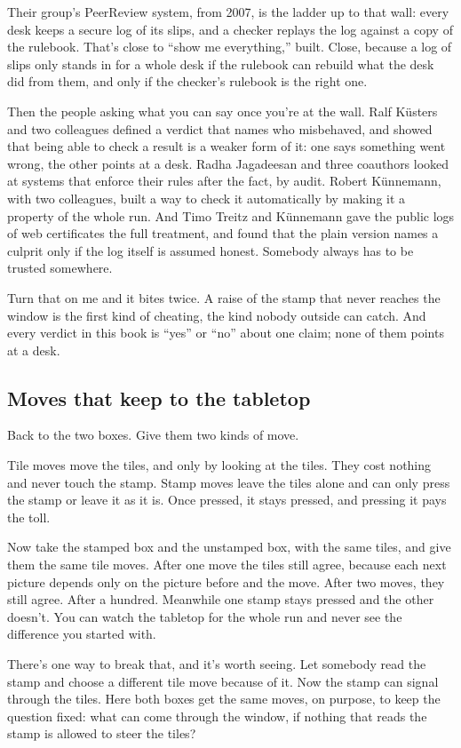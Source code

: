 \documentclass[11pt,twoside]{article}
\theoremstyle{thielethm}
\theoremstyle{thieledef}
\theoremstyle{thieledef}
\theoremstyle{thieledef}
\theoremstyle{thielethm}
\theoremstyle{thieleobs}
\theoremstyle{thielethm}
\begin{document}
Their group's PeerReview system, from 2007, is the ladder up to that wall: every desk keeps a secure log of its slips, and a checker replays the log against a copy of the rulebook. That's close to ``show me everything,'' built. Close, because a log of slips only stands in for a whole desk if the rulebook can rebuild what the desk did from them, and only if the checker's rulebook is the right one.

Then the people asking what you can say once you're at the wall. Ralf Küsters and two colleagues defined a verdict that names who misbehaved, and showed that being able to check a result is a weaker form of it: one says something went wrong, the other points at a desk. Radha Jagadeesan and three coauthors looked at systems that enforce their rules after the fact, by audit. Robert Künnemann, with two colleagues, built a way to check it automatically by making it a property of the whole run. And Timo Treitz and Künnemann gave the public logs of web certificates the full treatment, and found that the plain version names a culprit only if the log itself is assumed honest. Somebody always has to be trusted somewhere.

Turn that on me and it bites twice. A raise of the stamp that never reaches the window is the first kind of cheating, the kind nobody outside can catch. And every verdict in this book is ``yes'' or ``no'' about one claim; none of them points at a desk.

\subsection{Moves that keep to the tabletop}

Back to the two boxes. Give them two kinds of move.

Tile moves move the tiles, and only by looking at the tiles. They cost nothing and never touch the stamp. Stamp moves leave the tiles alone and can only press the stamp or leave it as it is. Once pressed, it stays pressed, and pressing it pays the toll.

Now take the stamped box and the unstamped box, with the same tiles, and give them the same tile moves. After one move the tiles still agree, because each next picture depends only on the picture before and the move. After two moves, they still agree. After a hundred. Meanwhile one stamp stays pressed and the other doesn't. You can watch the tabletop for the whole run and never see the difference you started with.

There's one way to break that, and it's worth seeing. Let somebody read the stamp and choose a different tile move because of it. Now the stamp can signal through the tiles. Here both boxes get the same moves, on purpose, to keep the question fixed: what can come through the window, if nothing that reads the stamp is allowed to steer the tiles?
\end{document}
